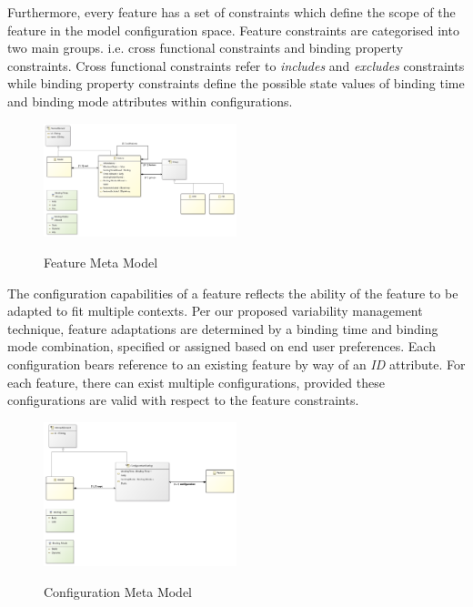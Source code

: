 \documentclass[conference]{IEEEtran}
\begin{document}
Furthermore, every feature has a set of constraints which define the scope of the feature in the model configuration space. Feature constraints are categorised into two main groups. i.e. cross functional constraints and binding property constraints.  Cross functional constraints refer to \textit{includes} and \textit{excludes} constraints while binding property constraints define the possible state values of binding time and binding mode attributes within configurations.

\begin{figure}[H]
\caption{Feature Meta Model}
\centering
\includegraphics[width=0.5\textwidth]{diagrams/feature.png}
\label{femet}
\end{figure}

The configuration capabilities of a feature reflects the ability of the feature to be adapted to fit multiple contexts. Per our proposed variability management technique,
feature adaptations are determined by a binding time and binding mode combination, specified or assigned based on end user preferences. Each configuration bears reference to an existing feature by way of an \textit{ID} attribute. For each feature, there can exist multiple configurations, provided these configurations are valid with respect to the feature constraints.

\begin{figure}[H]
\caption{Configuration Meta Model}
\centering
\includegraphics[width=0.5\textwidth]{diagrams/config.png}
\label{conmet}
\end{figure}
\end{document}
